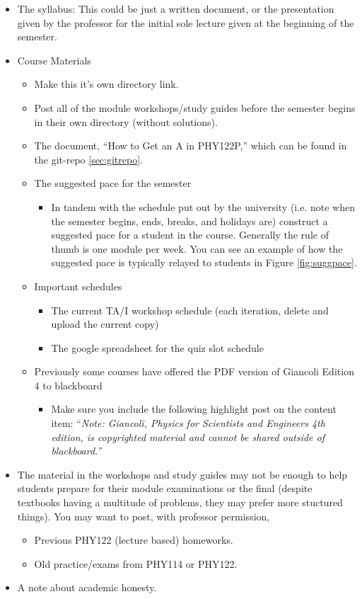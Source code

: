 \documentclass[12pt]{article}
\begin{document}
\begin{itemize}
	\item The syllabus: This could be just a written document, or the presentation given by the professor for the initial sole lecture given at the beginning of the semester.
	\item Course Materials
		\begin{itemize}
			\item Make this it's own directory link.
			\item Post all of the module workshops/study guides before the semester begins in their own directory (without solutions).
			\item The document, ``How to Get an A in PHY122P,'' which can be found in the git-repo \ref{sec:gitrepo}.
			\item The suggested pace for the semester
				\begin{itemize}
					\item In tandem with the schedule put out by the university (i.e. note when the semester begins, ends, breaks, and holidays are) construct a suggested pace for a student in the course. Generally the rule of thumb is one module per week. You can see an example of how the suggested pace is typically relayed to students in Figure \ref{fig:suggpace}.
				\end{itemize}
			\item Important schedules
				\begin{itemize}
					\item The current TA/I workshop schedule (each iteration, delete and upload the current copy)
					\item The google spreadsheet for the quiz slot schedule
				\end{itemize}
			\item Previously some courses have offered the PDF version of Giancoli Edition 4 to blackboard
				\begin{itemize}
					\item Make sure you include the following highlight post on the content item: ``\emph{Note: Giancoli, Physics for Scientists and Engineers 4th edition, is copyrighted material and cannot be shared outside of blackboard.}''
				\end{itemize}
		\end{itemize}
	\item The material in the workshops and study guides may not be enough to help students prepare for their module examinations or the final (despite textbooks having a multitude of problems, they may prefer more stuctured things). You may want to post, with professor permission,
		\begin{itemize}
			\item Previous PHY122 (lecture based) homeworks.
			\item Old practice/exams from PHY114 or PHY122.
		\end{itemize}
	\item A note about academic honesty.
\end{itemize}
\end{document}
